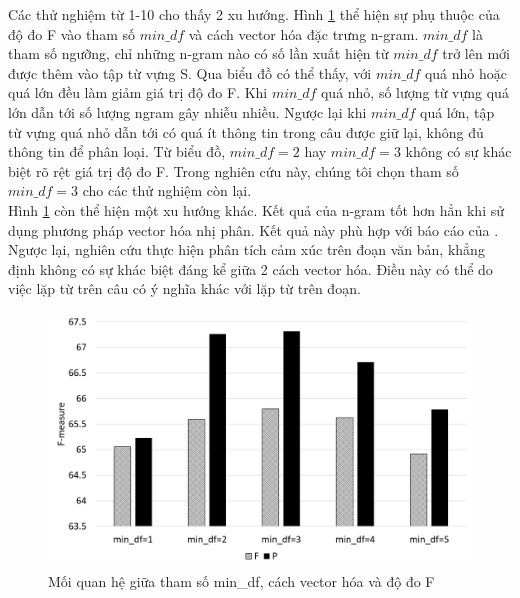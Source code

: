 Các thử nghiệm từ 1-10 cho thấy 2 xu hướng. Hình \ref{fig:mindf-p-f} thể hiện sự phụ thuộc của độ đo F vào tham số $min\_df$ và cách vector hóa đặc trưng n-gram. $min\_df$ là tham số ngưỡng, chỉ những n-gram nào có số lần xuất hiện từ $min\_df$ trở lên mới được thêm vào tập từ vựng S. Qua biểu đồ có thể thấy, với $min\_df$ quá nhỏ hoặc quá lớn đều làm giảm giá trị độ đo F. Khi $min\_df$ quá nhỏ, số lượng từ vựng quá lớn dẫn tới số lượng ngram gây nhiễu nhiều. Ngược lại khi $min\_df$ quá lớn, tập từ vựng quá nhỏ dẫn tới có quá ít thông tin trong câu được giữ lại, không đủ thông tin để phân loại. Từ biểu đồ, $min\_df=2$ hay $min\_df=3$ không có sự khác biệt rõ rệt giá trị độ đo F. Trong nghiên cứu này, chúng tôi chọn tham số $min\_df=3$ cho các thử nghiệm còn lại.\\

Hình \ref{fig:mindf-p-f} còn thể hiện một xu hướng khác. Kết quả của n-gram tốt hơn hẳn khi sử dụng phương pháp vector hóa nhị phân. Kết quả này phù hợp với báo cáo của \cite{pang2002thumbs}. Ngược lại, nghiên cứu \cite{sarker2011outcome} thực hiện phân tích cảm xúc trên đoạn văn bản, khẳng định không có sự khác biệt đáng kể giữa 2 cách vector hóa. Điều này có thể do việc lặp từ trên câu có ý nghĩa khác với lặp từ trên đoạn.\\

\begin{figure}[h]
\centering
\includegraphics[scale=0.25]{../hinh/mindf_p_f.png}
\caption{Mối quan hệ giữa tham số min\_df, cách vector hóa và độ đo F} \label{fig:mindf-p-f}
\end{figure}


